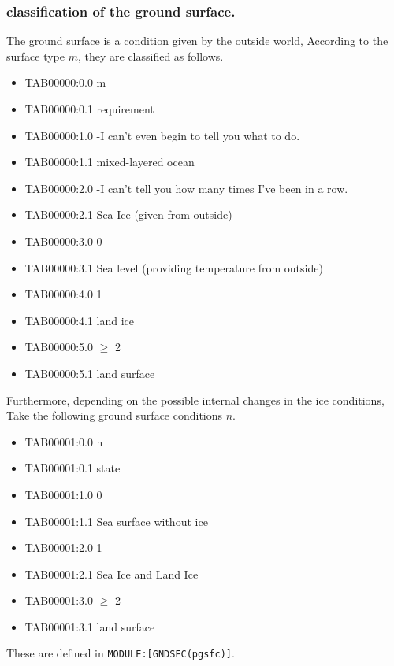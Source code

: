 \hypertarget{classification-of-the-ground-surface.}{%
\subsubsection{classification of the ground
surface.}\label{classification-of-the-ground-surface.}}

The ground surface is a condition given by the outside world, According
to the surface type \(m\), they are classified as follows.

\begin{itemize}
\item
  TAB00000:0.0 m
\item
  TAB00000:0.1 requirement
\item
  TAB00000:1.0 -I can't even begin to tell you what to do.
\item
  TAB00000:1.1 mixed-layered ocean
\item
  TAB00000:2.0 -I can't tell you how many times I've been in a row.
\item
  TAB00000:2.1 Sea Ice (given from outside)
\item
  TAB00000:3.0 0
\item
  TAB00000:3.1 Sea level (providing temperature from outside)
\item
  TAB00000:4.0 1
\item
  TAB00000:4.1 land ice
\item
  TAB00000:5.0 \(\ge\) 2
\item
  TAB00000:5.1 land surface
\end{itemize}

Furthermore, depending on the possible internal changes in the ice
conditions, Take the following ground surface conditions \(n\).

\begin{itemize}
\item
  TAB00001:0.0 n
\item
  TAB00001:0.1 state
\item
  TAB00001:1.0 0
\item
  TAB00001:1.1 Sea surface without ice
\item
  TAB00001:2.0 1
\item
  TAB00001:2.1 Sea Ice and Land Ice
\item
  TAB00001:3.0 \(\ge\) 2
\item
  TAB00001:3.1 land surface
\end{itemize}

These are defined in \texttt{MODULE:{[}GNDSFC(pgsfc){]}}.

